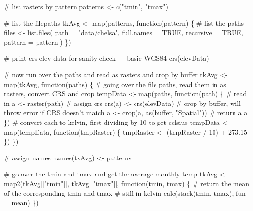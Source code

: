 \documentclass[
]{article}
\newenvironment{Shaded}{}{}
\newcommand{\CommentTok}[1]{\textcolor[rgb]{0.00,0.50,0.00}{#1}}
\newcommand{\ControlFlowTok}[1]{\textcolor[rgb]{0.00,0.00,1.00}{#1}}
\newcommand{\DataTypeTok}[1]{#1}
\newcommand{\DecValTok}[1]{#1}
\newcommand{\FloatTok}[1]{#1}
\newcommand{\KeywordTok}[1]{\textcolor[rgb]{0.00,0.00,1.00}{#1}}
\newcommand{\NormalTok}[1]{#1}
\newcommand{\OperatorTok}[1]{#1}
\newcommand{\OtherTok}[1]{\textcolor[rgb]{1.00,0.25,0.00}{#1}}
\newcommand{\StringTok}[1]{\textcolor[rgb]{0.00,0.50,0.50}{#1}}
\begin{document}
\begin{Shaded}
\begin{Highlighting}[]
\CommentTok{# list rasters by pattern}
\NormalTok{patterns <-}\StringTok{ }\KeywordTok{c}\NormalTok{(}\StringTok{"tmin"}\NormalTok{, }\StringTok{"tmax"}\NormalTok{)}

\CommentTok{# list the filepaths}
\NormalTok{tkAvg <-}\StringTok{ }\KeywordTok{map}\NormalTok{(patterns, }\ControlFlowTok{function}\NormalTok{(pattern) \{}
  \CommentTok{# list the paths}
\NormalTok{  files <-}\StringTok{ }\KeywordTok{list.files}\NormalTok{(}
    \DataTypeTok{path =} \StringTok{"data/chelsa"}\NormalTok{,}
    \DataTypeTok{full.names =} \OtherTok{TRUE}\NormalTok{,}
    \DataTypeTok{recursive =} \OtherTok{TRUE}\NormalTok{,}
    \DataTypeTok{pattern =}\NormalTok{ pattern}
\NormalTok{  )}
\NormalTok{\})}

\CommentTok{# print crs elev data for sanity check --- basic WGS84}
\KeywordTok{crs}\NormalTok{(elevData)}

\CommentTok{# now run over the paths and read as rasters and crop by buffer}
\NormalTok{tkAvg <-}\StringTok{ }\KeywordTok{map}\NormalTok{(tkAvg, }\ControlFlowTok{function}\NormalTok{(paths) \{}
  \CommentTok{# going over the file paths, read them in as rasters, convert CRS and crop}
\NormalTok{  tempData <-}\StringTok{ }\KeywordTok{map}\NormalTok{(paths, }\ControlFlowTok{function}\NormalTok{(path) \{}
    \CommentTok{# read in}
\NormalTok{    a <-}\StringTok{ }\KeywordTok{raster}\NormalTok{(path)}
    \CommentTok{# assign crs}
    \KeywordTok{crs}\NormalTok{(a) <-}\StringTok{ }\KeywordTok{crs}\NormalTok{(elevData)}
    \CommentTok{# crop by buffer, will throw error if CRS doesn't match}
\NormalTok{    a <-}\StringTok{ }\KeywordTok{crop}\NormalTok{(a, }\KeywordTok{as}\NormalTok{(buffer, }\StringTok{"Spatial"}\NormalTok{))}
    \CommentTok{# return a}
\NormalTok{    a}
\NormalTok{  \})}
  \CommentTok{# convert each to kelvin, first dividing by 10 to get celsius}
\NormalTok{  tempData <-}\StringTok{ }\KeywordTok{map}\NormalTok{(tempData, }\ControlFlowTok{function}\NormalTok{(tmpRaster) \{}
\NormalTok{    tmpRaster <-}\StringTok{ }\NormalTok{(tmpRaster }\OperatorTok{/}\StringTok{ }\DecValTok{10}\NormalTok{) }\OperatorTok{+}\StringTok{ }\FloatTok{273.15}
\NormalTok{  \})}
\NormalTok{\})}

\CommentTok{# assign names}
\KeywordTok{names}\NormalTok{(tkAvg) <-}\StringTok{ }\NormalTok{patterns}

\CommentTok{# go over the tmin and tmax and get the average monthly temp}
\NormalTok{tkAvg <-}\StringTok{ }\KeywordTok{map2}\NormalTok{(tkAvg[[}\StringTok{"tmin"}\NormalTok{]], tkAvg[[}\StringTok{"tmax"}\NormalTok{]], }\ControlFlowTok{function}\NormalTok{(tmin, tmax) \{}
  \CommentTok{# return the mean of the corresponding tmin and tmax}
  \CommentTok{# still in kelvin}
  \KeywordTok{calc}\NormalTok{(}\KeywordTok{stack}\NormalTok{(tmin, tmax), }\DataTypeTok{fun =}\NormalTok{ mean)}
\NormalTok{\})}


\end{Highlighting}
\end{Shaded}
\end{document}
